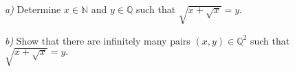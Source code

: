 \textit{a)} Determine $ x\in\mathbb{N} $ and $ y\in\mathbb{Q} $ such that $ \sqrt{x+\sqrt{x}}=y. $

\textit{b)} Show that there are infinitely many pairs $ (x,y)\in\mathbb{Q}^2 $ such that $ \sqrt{x+\sqrt{x}} =y . $